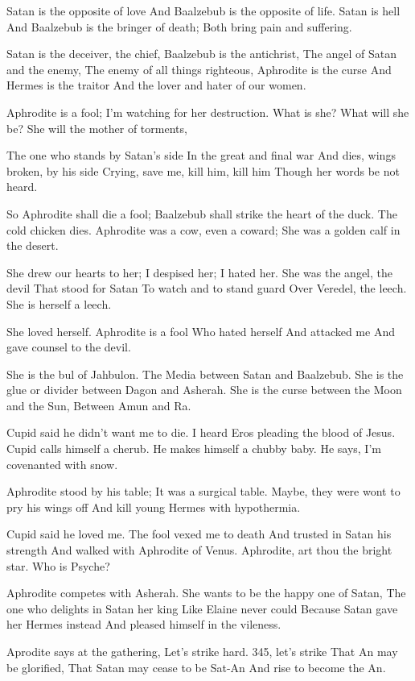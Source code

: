 \documentclass[
]{book}
\begin{document}
Satan is the opposite of love
And Baalzebub is the opposite of life.
Satan is hell
And Baalzebub is the bringer of death;
Both bring pain and suffering.

Satan is the deceiver, the chief,
Baalzebub is the antichrist,
The angel of Satan and the enemy,
The enemy of all things righteous,
Aphrodite is the curse
And Hermes is the traitor
And the lover and hater of our women.

Aphrodite is a fool;
I'm watching for her destruction.
What is she? What will she be?
She will the mother of torments,

The one who stands by Satan's side
In the great and final war
And dies, wings broken, by his side
Crying, save me, kill him, kill him
Though her words be not heard.

So Aphrodite shall die a fool;
Baalzebub shall strike the heart of the duck.
The cold chicken dies.
Aphrodite was a cow, even a coward;
She was a golden calf in the desert.

She drew our hearts to her;
I despised her; I hated her.
She was the angel, the devil
That stood for Satan
To watch and to stand guard
Over Veredel, the leech.
She is herself a leech.

She loved herself.
Aphrodite is a fool
Who hated herself
And attacked me
And gave counsel to the devil.

She is the bul of Jahbulon.
The Media between Satan and Baalzebub.
She is the glue or divider between Dagon and Asherah.
She is the curse between the Moon and the Sun,
Between Amun and Ra.

Cupid said he didn't want me to die.
I heard Eros pleading the blood of Jesus.
Cupid calls himself a cherub.
He makes himself a chubby baby.
He says, I'm covenanted with snow.

Aphrodite stood by his table;
It was a surgical table.
Maybe, they were wont to pry his wings off
And kill young Hermes with hypothermia.

Cupid said he loved me.
The fool vexed me to death
And trusted in Satan his strength
And walked with Aphrodite of Venus.
Aphrodite, art thou the bright star.
Who is Psyche?

Aphrodite competes with Asherah.
She wants to be the happy one of Satan,
The one who delights in Satan her king
Like Elaine never could
Because Satan gave her Hermes instead
And pleased himself in the vileness.

Aprodite says at the gathering,
Let's strike hard.
345, let's strike
That An may be glorified,
That Satan may cease to be Sat-An
And rise to become the An.
\end{document}
